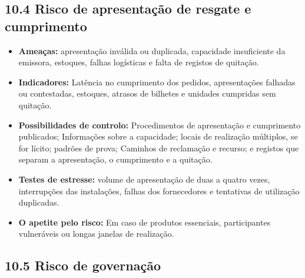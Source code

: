 \documentclass[11pt]{article}
\begin{document}
\subsection*{10.4 Risco de apresentação de resgate e cumprimento}

\begin{itemize}[leftmargin=*]
\item \textbf{Ameaças:} apresentação inválida ou duplicada, capacidade insuficiente da emissora, estoques, falhas logísticas e falta de registos de quitação.
\item \textbf{Indicadores:} Latência no cumprimento dos pedidos, apresentações falhadas ou contestadas, estoques, atrasos de bilhetes e unidades cumpridas sem quitação.
\item \textbf{Possibilidades de controlo:} Procedimentos de apresentação e cumprimento publicados; Informações sobre a capacidade; locais de realização múltiplos, se for lícito; padrões de prova; Caminhos de reclamação e recurso; e registos que separam a apresentação, o cumprimento e a quitação.
\item \textbf{Testes de estresse:} volume de apresentação de duas a quatro vezes, interrupções das instalações, falhas dos fornecedores e tentativas de utilização duplicadas.
\item \textbf{O apetite pelo risco:} Em caso de produtos essenciais, participantes vulneráveis ou longas janelas de realização.
\end{itemize}
\subsection*{10.5 Risco de governação}
\end{document}
